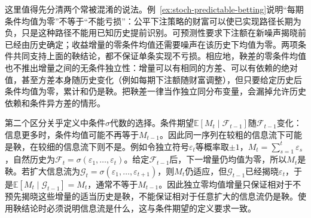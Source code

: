 这里值得先分清两个常被混淆的说法。例~\ref{ex:stoch-predictable-betting}说明“每期条件均值为零”不等于“不能亏损”：公平下注策略的财富可以使已实现路径长期为负，只是这种路径不能用已知历史提前识别。可预测性要求下注额在新噪声揭晓前已经由历史确定；收益增量的零条件均值还需要噪声在该历史下均值为零。两项条件共同支持上面的鞅结论，都不保证单条实现不亏损。相应地，鞅差的零条件均值也不推出增量之间的无条件独立性：增量可以有相同的方差、可以有依赖的绝对值，甚至方差本身随历史变化（例如每期下注额随财富调整），但只要给定历史后条件均值为零，累计和仍是鞅。把鞅差一律当作独立同分布变量，会漏掉允许历史依赖和条件异方差的情形。

第二个区分关乎定义中条件\(\sigma\)代数的选择。条件期望\(\mathbb E[M_t\mid\mathcal F_{t-1}]\)随\(\mathcal F_{t-1}\)变化：信息更多时，条件均值可能不再等于\(M_{t-1}\)。因此同一序列在较粗的信息流下可能是鞅，在较细的信息流下则不是。例如令独立符号\(\varepsilon_t\)等概率取\(\pm1\)，\(M_t=\sum_{s=1}^t\varepsilon_s\)，自然历史为\(\mathcal F_t=\sigma(\varepsilon_1,\ldots,\varepsilon_t)\)。给定\(\mathcal F_{t-1}\)后，下一增量仍均值为零，所以\(M_t\)是鞅。若扩大信息流为\(\mathcal G_t=\sigma(\varepsilon_1,\ldots,\varepsilon_{t+1})\)，则\(M_t\)仍适应，但\(\mathcal G_{t-1}\)已经揭晓\(\varepsilon_t\)，于是\(\mathbb E[M_t\mid\mathcal G_{t-1}]=M_t\)，通常不等于\(M_{t-1}\)。因此独立零均值增量只保证相对于不预先揭晓这些增量的适当历史是鞅，不能保证相对于任意扩大的信息流仍是鞅。使用鞅结论时必须说明信息流是什么，这与条件期望的定义要求一致。

